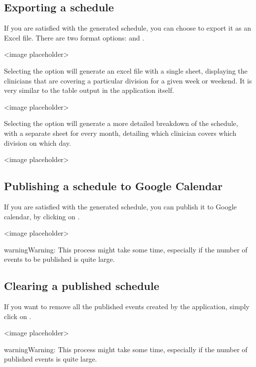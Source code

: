 \documentclass[letterpaper,10pt,english]{sphinxmanual}
\begin{document}
\subsection{Exporting a schedule}
\label{\detokenize{index:exporting-a-schedule}}
If you are satisfied with the generated schedule, you can choose to export
it as an Excel file. There are two format options:  and
.

\textless{}image placeholder\textgreater{}

Selecting the  option will generate an excel file with a single
sheet, displaying the clinicians that are covering a particular division
for a given week or weekend. It is very similar to the table output in
the application itself.

\textless{}image placeholder\textgreater{}

Selecting the  option will generate a more detailed breakdown
of the schedule, with a separate sheet for every month, detailing which
clinician covers which division on which day.

\textless{}image placeholder\textgreater{}


\subsection{Publishing a schedule to Google Calendar}
\label{\detokenize{index:publishing-a-schedule-to-google-calendar}}\label{\detokenize{index:id5}}
If you are satisfied with the generated schedule, you can publish it
to Google calendar, by clicking on .

\textless{}image placeholder\textgreater{}

\begin{sphinxadmonition}{warning}{Warning:}
This process might take some time, especially if the number of events
to be published is quite large.
\end{sphinxadmonition}


\subsection{Clearing a published schedule}
\label{\detokenize{index:clearing-a-published-schedule}}
If you want to remove all the published events created by the application,
simply click on .

\textless{}image placeholder\textgreater{}

\begin{sphinxadmonition}{warning}{Warning:}
This process might take some time, especially if the number of published
events is quite large.
\end{sphinxadmonition}



\renewcommand{\indexname}{Index}
\printindex
\end{document}
